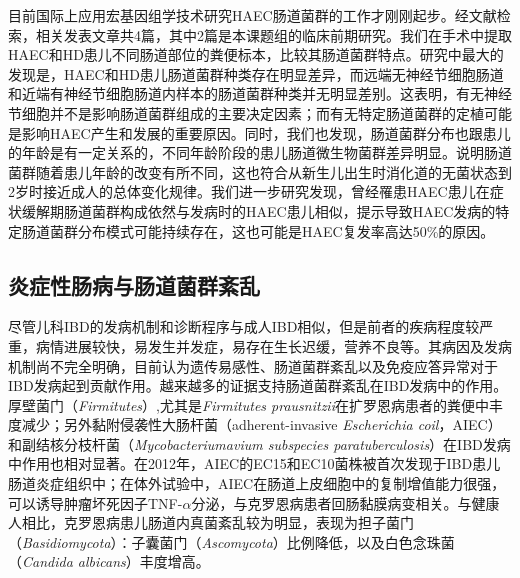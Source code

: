 目前国际上应用宏基因组学技术研究HAEC肠道菌群的工作才刚刚起步。经文献检索，相关发表文章共4篇，其中2篇是本课题组的临床前期研究\cite{yan2014characterization,li2016characterization}。我们在手术中提取HAEC和HD患儿不同肠道部位的粪便标本，比较其肠道菌群特点。研究中最大的发现是，HAEC和HD患儿肠道菌群种类存在明显差异，而远端无神经节细胞肠道和近端有神经节细胞肠道内样本的肠道菌群种类并无明显差别。这表明，有无神经节细胞并不是影响肠道菌群组成的主要决定因素；而有无特定肠道菌群的定植可能是影响HAEC产生和发展的重要原因。同时，我们也发现，肠道菌群分布也跟患儿的年龄是有一定关系的，不同年龄阶段的患儿肠道微生物菌群差异明显。说明肠道菌群随着患儿年龄的改变有所不同，这也符合从新生儿出生时消化道的无菌状态到2岁时接近成人的总体变化规律。我们进一步研究发现，曾经罹患HAEC患儿在症状缓解期肠道菌群构成依然与发病时的HAEC患儿相似，提示导致HAEC发病的特定肠道菌群分布模式可能持续存在，这也可能是HAEC复发率高达50\%的原因\cite{li2016characterization}。
\subsection{炎症性肠病与肠道菌群紊乱}
尽管儿科IBD的发病机制和诊断程序与成人IBD相似，但是前者的疾病程度较严重，病情进展较快，易发生并发症，易存在生长迟缓，营养不良等。其病因及发病机制尚不完全明确，目前认为遗传易感性、肠道菌群紊乱以及免疫应答异常对于IBD发病起到贡献作用\cite{liang2014role}。越来越多的证据支持肠道菌群紊乱在IBD发病中的作用。厚壁菌门（\textit{Firmitutes}）,尤其是\textit{Firmitutes prausnitzii}在扩罗恩病患者的粪便中丰度减少\cite{mosca2016gut}；另外黏附侵袭性大肠杆菌（adherent-invasive \textit{Escherichia
coil}，AIEC）和副结核分枝杆菌（\textit{Mycobacteriumavium subspecies paratuberculosis}）在IBD发病中作用也相对显著。在2012年，AIEC的EC15和EC10菌株被首次发现于IBD患儿肠道炎症组织中\cite{negroni2011characterization}；在体外试验中，AIEC在肠道上皮细胞中的复制增值能力很强，可以诱导肿瘤坏死因子TNF-$\alpha$分泌，与克罗恩病患者回肠黏膜病变相关\cite{o2017comparative}。与健康人相比，克罗恩病患儿肠道内真菌紊乱较为明显，表现为担子菌门（\textit{Basidiomycota}）：子囊菌门（\textit{Ascomycota}）比例降低，以及白色念珠菌（\textit{Candida albicans}）丰度增高\cite{sokol2017fungal}。
\\
